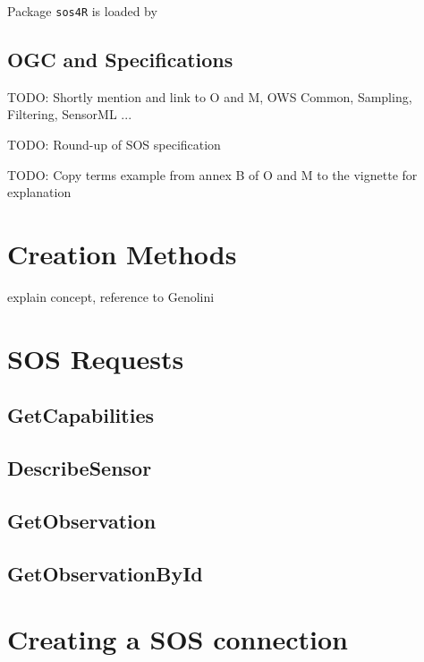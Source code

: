 \documentclass{article}
\begin{document}
Package {\tt sos4R} is loaded by 


\subsection{OGC and Specifications}

TODO: Shortly mention and link to O and M, OWS Common, Sampling, Filtering, SensorML ...

TODO: Round-up of SOS specification

TODO: Copy terms example from annex B of O and M to the vignette for explanation


\section{Creation Methods}

explain concept, reference to Genolini

\section{SOS Requests}

\subsection{GetCapabilities}


\subsection{DescribeSensor}


\subsection{GetObservation}


\subsection{GetObservationById}

\section{Creating a SOS connection}

\end{document}
